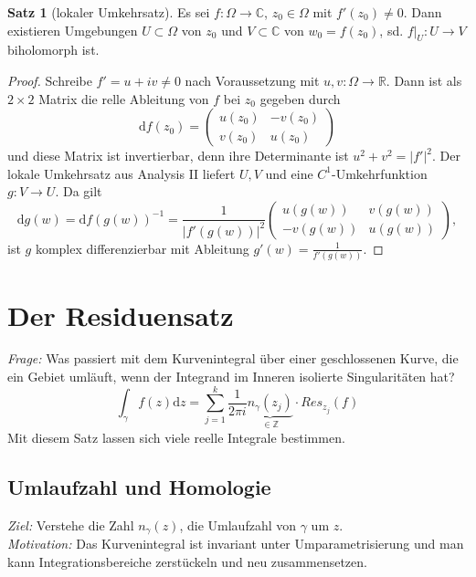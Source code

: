 \documentclass[11pt,titlepage]{article}
\theoremstyle{definition}
\newtheorem{theorem}{Satz}[section]
\theoremstyle{remark}
\begin{document}
	\begin{theorem}[lokaler Umkehrsatz]
		Es sei $f:\Omega\to\mathbb{C}$, $z_0\in\Omega$ mit $f'(z_0)\neq 0$. Dann existieren 
		Umgebungen $U\subset\Omega$ von $z_0$ und $V\subset\mathbb{C}$ von $w_0=f(z_0)$, 
		sd. $f|_U :U\to V$ biholomorph ist.
	\end{theorem}
	
	\begin{proof}
		Schreibe $f'=u+iv \neq 0$ nach Voraussetzung mit $u,v:\Omega\to\mathbb{R}$. Dann ist 
		als $2\times 2$ Matrix die relle Ableitung von $f$ bei $z_0$ gegeben durch 
		\[ \mathrm{d}f(z_0) =\begin{pmatrix} u(z_0)&-v(z_0)\\v(z_0)&u(z_0)\end{pmatrix} \]
		und diese Matrix ist invertierbar, denn ihre Determinante ist $u^2 +v^2 =|f'|^2$. 
		Der lokale Umkehrsatz aus Analysis II liefert $U,V$ und eine $C^1$-Umkehrfunktion 
		$g:V\to U$. Da gilt
		\[ \mathrm{d}g(w) =\mathrm{d} f(g(w))^{-1} =\frac{1}{|f'(g(w))|^2} 
		\begin{pmatrix} u(g(w))&v(g(w))\\-v(g(w))&u(g(w))\end{pmatrix}, \]
		ist $g$ komplex differenzierbar mit Ableitung $g'(w)=\frac{1}{f'(g(w))}$.
	\end{proof}
	
	\section{Der Residuensatz}
	
	\textsl{Frage:} Was passiert mit dem Kurvenintegral über einer geschlossenen Kurve, die ein Gebiet 
	umläuft, wenn der Integrand im Inneren isolierte Singularitäten hat?
	\[ \int_{\gamma} f(z)\mathrm{d}z =\sum_{j=1}^k \frac{1}{2\pi i} \underbrace{n_{\gamma}(z_j)}_{\in\mathbb{Z}}
	\cdot Res_{z_j}(f) \]
	Mit diesem Satz lassen sich viele reelle Integrale bestimmen.
	
	\subsection{Umlaufzahl und Homologie}
	
	\textsl{Ziel:} Verstehe die Zahl $n_{\gamma}(z)$, die Umlaufzahl von $\gamma$ um $z$. \\
	\textsl{Motivation:} Das Kurvenintegral ist invariant unter Umparametrisierung und man kann 
	Integrationsbereiche zerstückeln und neu zusammensetzen.
	
\end{document}
